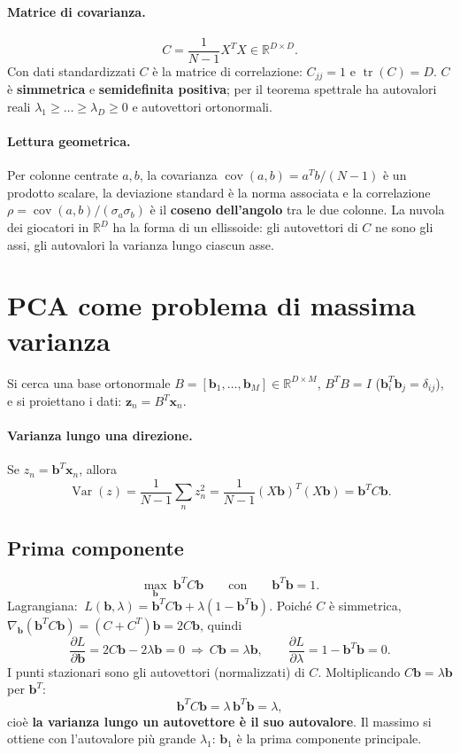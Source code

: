 \documentclass[11pt,a4paper]{article}
\theoremstyle{remark}
\newcommand{\R}{\mathbb{R}}
\newcommand{\bb}{\mathbf{b}}
\newcommand{\x}{\mathbf{x}}
\newcommand{\z}{\mathbf{z}}
\begin{document}
\paragraph{Matrice di covarianza.}
\[
C=\frac{1}{N-1}X^{T}X\in\R^{D\times D}.
\]
Con dati standardizzati $C$ \`e la matrice di correlazione: $C_{jj}=1$ e $\operatorname{tr}(C)=D$.
$C$ \`e \textbf{simmetrica} e \textbf{semidefinita positiva}; per il teorema spettrale ha autovalori
reali $\lambda_1\ge\dots\ge\lambda_D\ge 0$ e autovettori ortonormali.

\paragraph{Lettura geometrica.}
Per colonne centrate $a,b$, la covarianza $\operatorname{cov}(a,b)=a^Tb/(N-1)$ \`e un prodotto scalare,
la deviazione standard \`e la norma associata e la correlazione
$\rho=\operatorname{cov}(a,b)/(\sigma_a\sigma_b)$ \`e il \textbf{coseno dell'angolo} tra le due colonne.
La nuvola dei giocatori in $\R^D$ ha la forma di un ellissoide: gli autovettori di $C$ ne sono gli assi,
gli autovalori la varianza lungo ciascun asse.

\section{PCA come problema di massima varianza}
Si cerca una base ortonormale $B=[\bb_1,\dots,\bb_M]\in\R^{D\times M}$, $B^TB=I$
($\bb_i^T\bb_j=\delta_{ij}$), e si proiettano i dati: $\z_n=B^T\x_n$.

\paragraph{Varianza lungo una direzione.}
Se $z_n=\bb^T\x_n$, allora
\[
\operatorname{Var}(z)=\frac{1}{N-1}\sum_n z_n^2=\frac{1}{N-1}(X\bb)^T(X\bb)=\bb^TC\bb .
\]

\subsection{Prima componente}
\[
\max_{\bb}\ \bb^TC\bb\qquad\text{con}\qquad \bb^T\bb=1 .
\]
Lagrangiana: $\ L(\bb,\lambda)=\bb^TC\bb+\lambda(1-\bb^T\bb)$.
Poich\'e $C$ \`e simmetrica, $\nabla_{\bb}(\bb^TC\bb)=(C+C^T)\bb=2C\bb$, quindi
\[
\frac{\partial L}{\partial\bb}=2C\bb-2\lambda\bb=0\ \Longrightarrow\ C\bb=\lambda\bb,
\qquad
\frac{\partial L}{\partial\lambda}=1-\bb^T\bb=0 .
\]
I punti stazionari sono gli autovettori (normalizzati) di $C$. Moltiplicando $C\bb=\lambda\bb$ per $\bb^T$:
\[
\bb^TC\bb=\lambda\,\bb^T\bb=\lambda,
\]
cio\`e \textbf{la varianza lungo un autovettore \`e il suo autovalore}.
Il massimo si ottiene con l'autovalore pi\`u grande $\lambda_1$: $\bb_1$ \`e la prima componente principale.
\end{document}
